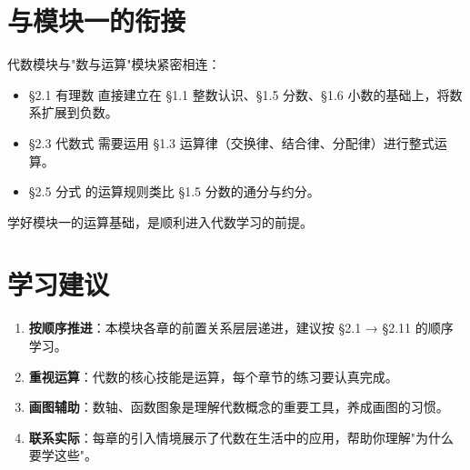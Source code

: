 \section*{与模块一的衔接}


代数模块与"数与运算"模块紧密相连：

\begin{itemize}
  \item §2.1 有理数 直接建立在 §1.1 整数认识、§1.5 分数、§1.6 小数的基础上，将数系扩展到负数。
  \item §2.3 代数式 需要运用 §1.3 运算律（交换律、结合律、分配律）进行整式运算。
  \item §2.5 分式 的运算规则类比 §1.5 分数的通分与约分。
\end{itemize}


学好模块一的运算基础，是顺利进入代数学习的前提。

\section*{学习建议}


\begin{enumerate}
  \item \textbf{按顺序推进}：本模块各章的前置关系层层递进，建议按 §2.1 → §2.11 的顺序学习。
  \item \textbf{重视运算}：代数的核心技能是运算，每个章节的练习要认真完成。
  \item \textbf{画图辅助}：数轴、函数图象是理解代数概念的重要工具，养成画图的习惯。
  \item \textbf{联系实际}：每章的引入情境展示了代数在生活中的应用，帮助你理解"为什么要学这些"。
\end{enumerate}

